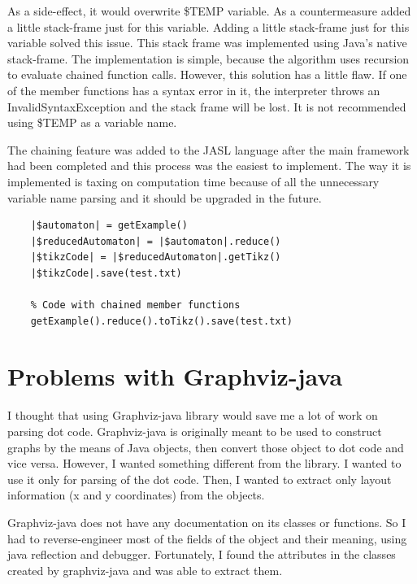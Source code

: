 \documentclass{ctuthesis}
\begin{document}
As a side-effect, it would overwrite \$TEMP variable. As a countermeasure added a little stack-frame just for this variable. Adding a little stack-frame just for this variable solved this issue. This stack frame was implemented using Java's native stack-frame. The implementation is simple, because the algorithm uses recursion to evaluate chained function calls. However, this solution has a little flaw. If one of the member functions has a syntax error in it, the interpreter throws an InvalidSyntaxException and the stack frame will be lost. It is not recommended using \$TEMP as a variable name. 

The chaining feature was added to the JASL language after the main framework had been completed and this process was the easiest to implement. The way it is implemented is taxing on computation time because of all the unnecessary variable name parsing and it should be upgraded in the future. 

\begin{minipage}{\linewidth}
\begin{lstlisting}[language = JASL]
	% Code without chained member function calls
	|$automaton| = getExample()
	|$reducedAutomaton| = |$automaton|.reduce()
	|$tikzCode| = |$reducedAutomaton|.getTikz()
	|$tikzCode|.save(test.txt)
	
	% Code with chained member functions
	getExample().reduce().toTikz().save(test.txt)
\end{lstlisting}
\end{minipage}

\section{Problems with Graphviz-java}
\label{subsec:graphviz-java-problems}
I thought that using Graphviz-java library would save me a lot of work on parsing dot code. Graphviz-java is originally meant to be used to construct graphs by the means of Java objects, then convert those object to dot code and vice versa. However, I wanted something different from the library. I wanted to use it only for parsing of the dot code. Then, I wanted to extract only layout information (x and y coordinates) from the objects. 

Graphviz-java does not have any documentation on its classes or functions. So I had to reverse-engineer most of the fields of the object and their meaning, using java reflection and debugger. Fortunately, I found the attributes in the classes created by graphviz-java and was able to extract them. 
\end{document}

